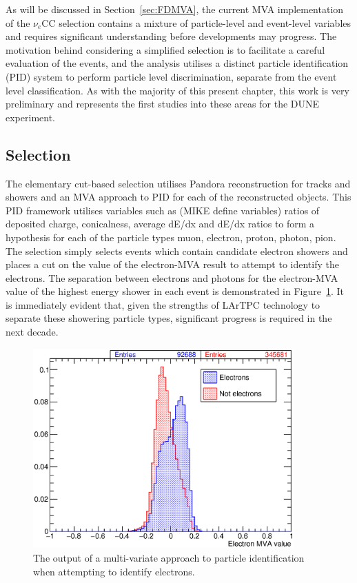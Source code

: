 As will be discussed in Section~\ref{sec:FDMVA}, the current MVA implementation of the $\nu_e$CC selection contains a mixture of particle-level and event-level variables and requires significant understanding before developments may progress.  The motivation behind considering a simplified selection is to facilitate a careful evaluation of the events, and the analysis utilises a distinct particle identification (PID) system to perform particle level discrimination, separate from the event level classification.  As with the majority of this present chapter, this work is very preliminary and represents the first studies into these areas for the DUNE experiment.

\subsection{Selection}\label{sec:FDCutSelection}

The elementary cut-based selection utilises Pandora reconstruction for tracks and showers and an MVA approach to PID for each of the reconstructed objects.  This PID framework \cite{GrantPID2016} utilises variables such as (MIKE define variables) ratios of deposited charge, conicalness, average dE/dx and dE/dx ratios to form a hypothesis for each of the particle types muon, electron, proton, photon, pion.  The selection simply selects events which contain candidate electron showers and places a cut on the value of the electron-MVA result to attempt to identify the electrons.  The separation between electrons and photons for the electron-MVA value of the highest energy shower in each event is demonstrated in Figure~\ref{fig:ElectronMVA}.  It is immediately evident that, given the strengths of LArTPC technology to separate these showering particle types, significant progress is required in the next decade.

\begin{figure}
  \centering
  \includegraphics[width=10cm]{ElectronMVA.eps}
  \caption[The output of a multi-variate approach to particle identification when attempting to identify electrons.]{The output of a multi-variate approach to particle identification when attempting to identify electrons.}
  \label{fig:ElectronMVA}
\end{figure}

